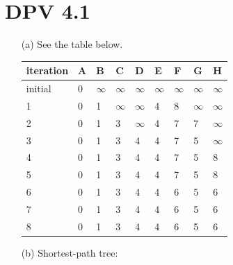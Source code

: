 \documentclass[twoside]{homework}
\begin{document}
\section{DPV 4.1}
\begin{enumerate}
	\item [(a)] See the table below.
	\begin{table}[!h]
		\centering
		\begin{tabular}{|l|l|l|l|l|l|l|l|l|}
		\hline
		iteration & A & B        & C        & D        & E        & F        & G        & H        \\ \hline
		initial   & 0 & $\infty$ & $\infty$ & $\infty$ & $\infty$ & $\infty$ & $\infty$ & $\infty$ \\ \hline
		1         & 0 & 1        & $\infty$ & $\infty$ & 4        & 8        & $\infty$ & $\infty$ \\ \hline
		2         & 0 & 1        & 3        & $\infty$ & 4        & 7        & 7        & $\infty$ \\ \hline
		3         & 0 & 1        & 3        & 4        & 4        & 7        & 5        & $\infty$ \\ \hline
		4         & 0 & 1        & 3        & 4        & 4        & 7        & 5        & 8        \\ \hline
		5         & 0 & 1        & 3        & 4        & 4        & 7        & 5        & 8        \\ \hline
		6         & 0 & 1        & 3        & 4        & 4        & 6        & 5        & 6        \\ \hline
		7         & 0 & 1        & 3        & 4        & 4        & 6        & 5        & 6        \\ \hline
		8         & 0 & 1        & 3        & 4        & 4        & 6        & 5        & 6        \\ \hline
		\end{tabular}
		\end{table}

	\item [(b)] Shortest-path tree: \\
	\begin{figure}[!h]
		\centering
\end{figure}
\end{enumerate}
\end{document}
